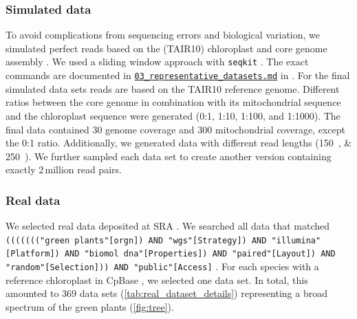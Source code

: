 \documentclass{bmcart}
\newcommand{\todo}[1]{\textcolor{red}{\bfseries(ToDO: #1})}
\newcommand{\zenododataset}{\cite{zenododataset}}
\begin{document}
\subsubsection*{Simulated data}
To avoid complications from sequencing errors and biological variation, we simulated perfect reads based on the  (TAIR10) chloroplast and core genome assembly \cite{tair10}.
We used a sliding window approach with \texttt{seqkit} \cite{seqkit}. The exact commands are documented in \href{https://github.com/chloroExtractorTeam/benchmark/blob/master/03_representative_datasets.md}{\texttt{03\_representative\_datasets.md}} in \zenododataset{}.
For the final simulated data sets reads are based on the TAIR10 reference genome.
Different ratios between the  core genome in combination with its mitochondrial sequence and the chloroplast sequence were generated (\num{0}:\num{1}, \num{1}:\num{10}, \num{1}:\num{100}, and \num{1}:\num{1000}).
The final data contained \SI{30}{\times} genome coverage and \SI{300}{\times} mitochondrial coverage, except the \num{0}:\num{1} ratio.
Additionally, we generated data with different read lengths (\SIlist{150;250}{\basepair}). We further sampled each data set to create another version containing exactly 2\,million read pairs.


\subsubsection*{Real data}
We selected real data deposited at SRA \cite{sra2010}.
We searched all data that matched \texttt{((((((("green plants"[orgn]) AND "wgs"[Strategy]) AND "illumina"[Platform]) AND "biomol dna"[Properties]) AND "paired"[Layout]) AND "random"[Selection])) AND "public"[Access]} \cite{sra_search_term}. 
For each species with a reference chloroplast in CpBase \cite{cpbase}, we selected one data set.
In total, this amounted to \num{369} data sets (\cref{tab:real_dataset_details}) representing a broad spectrum of the green plants (\cref{fig:tree}).
\end{document}
